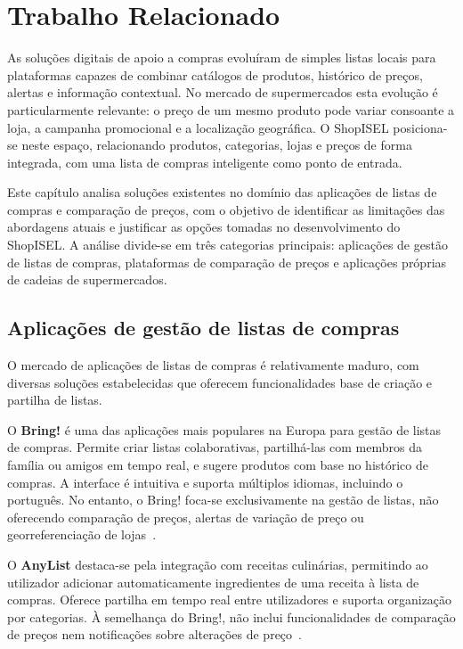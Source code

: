 
\chapter{Trabalho Relacionado}
\label{chap:3}

As soluções digitais de apoio a compras evoluíram de simples listas locais para plataformas capazes de combinar catálogos de produtos, histórico de preços, alertas e informação contextual. No mercado de supermercados esta evolução é particularmente relevante: o preço de um mesmo produto pode variar consoante a loja, a campanha promocional e a localização geográfica. O ShopISEL posiciona-se neste espaço, relacionando produtos, categorias, lojas e preços de forma integrada, com uma lista de compras inteligente como ponto de entrada.

Este capítulo analisa soluções existentes no domínio das aplicações de listas de compras e comparação de preços, com o objetivo de identificar as limitações das abordagens atuais e justificar as opções tomadas no desenvolvimento do ShopISEL. A análise divide-se em três categorias principais: aplicações de gestão de listas de compras, plataformas de comparação de preços e aplicações próprias de cadeias de supermercados.

\section{Aplicações de gestão de listas de compras}
\label{sec:3.1}

O mercado de aplicações de listas de compras é relativamente maduro, com diversas soluções estabelecidas que oferecem funcionalidades base de criação e partilha de listas.

O \textbf{Bring!} é uma das aplicações mais populares na Europa para gestão de listas de compras. Permite criar listas colaborativas, partilhá-las com membros da família ou amigos em tempo real, e sugere produtos com base no histórico de compras. A interface é intuitiva e suporta múltiplos idiomas, incluindo o português. No entanto, o Bring! foca-se exclusivamente na gestão de listas, não oferecendo comparação de preços, alertas de variação de preço ou georreferenciação de lojas~\cite{bring-app}.

O \textbf{AnyList} destaca-se pela integração com receitas culinárias, permitindo ao utilizador adicionar automaticamente ingredientes de uma receita à lista de compras. Oferece partilha em tempo real entre utilizadores e suporta organização por categorias. À semelhança do Bring!, não inclui funcionalidades de comparação de preços nem notificações sobre alterações de preço~\cite{anylist-app}.

